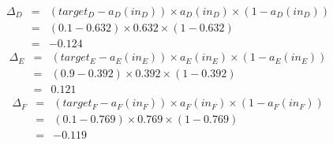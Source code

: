 \documentclass[--SOLUTION-OPTION--]{ditpaper}
\begin{document}
\begin{enumerate}
\begin{enumerate}
		\begin{answer}
		\begin{eqnarray*}
		\Delta_D& = &(target_D - a_D(in_D)) \times a_D(in_D) \times (1-a_D(in_D))\\
		& = &(0.1-0.632) \times 0.632 \times (1-0.632)\\
		& = &-0.124
		\end{eqnarray*}
		\begin{eqnarray*}
		\Delta_E& = &(target_E - a_E(in_E)) \times a_E(in_E) \times (1-a_E(in_E))\\
		& = &(0.9-0.392) \times 0.392 \times (1-0.392)\\
		& = &0.121
		\end{eqnarray*}
		\begin{eqnarray*}
		\Delta_F& = &(target_F - a_F(in_F)) \times a_F(in_F) \times (1-a_F(in_F))\\
		& = &(0.1-0.769) \times 0.769 \times (1-0.769)\\
		& = &-0.119
		\end{eqnarray*}
		\end{answer}
%

\end{enumerate}
\end{enumerate}
\end{document}
